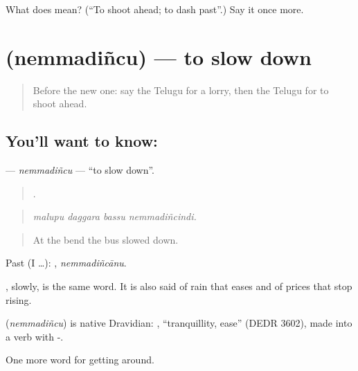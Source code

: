 \begin{tcolorbox}[breakable,colback=teal!4,colframe=teal!35!black,title={Before you move on}]
What does  mean? (\textquotedblleft{}To shoot ahead; to dash past\textquotedblright{}.) Say it once more.
\end{tcolorbox}
\section[\texorpdfstring{\te{నెమ్మదించు} (nemmadiñcu)}{నెమ్మదించు (nemmadiñcu)}]{ (nemmadiñcu) — to slow down}

\label{lesson:TE-C445-nemmadincu}



\begin{quote}
Before the new one: say the Telugu for a lorry, then the Telugu for to shoot ahead.
\end{quote}

\subsection*{You'll want to know: }
\textbf{} — \emph{nemmadiñcu} — \textquotedblleft{}to slow down\textquotedblright{}.

\begin{quote}
   .
\end{quote}

\begin{quote}
\emph{malupu daggara bassu nemmadiñcindi.}
\end{quote}

\begin{quote}
At the bend the bus slowed down.
\end{quote}

Past (I …): , \emph{nemmadiñcānu}.

, slowly, is the same word. It is also said of rain that eases and of prices that stop rising.

\begin{cousinweb}
\textbf{} (\emph{nemmadiñcu}) is native Dravidian: , \textquotedblleft{}tranquillity, ease\textquotedblright{} (DEDR 3602), made into a verb with -.
\end{cousinweb}

\begin{grammarlens}[title={What you've built}]
One more word for getting around.
\end{grammarlens}

